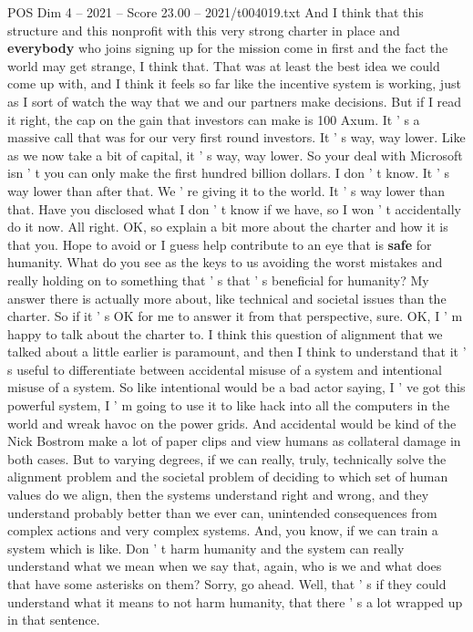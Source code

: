 \begin{textsample}{POS Dim 4 – 2021 – Score 23.00 – 2021/t004019.txt}
And I think that this structure and this nonprofit with this very strong charter in place and \textbf{everybody} who joins signing up for the mission come in first and the fact the world may get strange, I think that.
That was at least the best idea we could come up with, and I think it feels so far like the incentive system is working, just as I sort of watch the way that we and our partners make decisions.
But if I read it right, the cap on the gain that investors can make is 100 Axum.
It ' s a massive call that was for our very first round investors.
It ' s way, way lower.
Like as we now take a bit of capital, it ' s way, way lower.
So your deal with Microsoft isn ' t you can only make the first hundred billion dollars.
I don ' t know.
It ' s way lower than after that.
We ' re giving it to the world.
It ' s way lower than that.
Have you disclosed what I don ' t know if we have, so I won ' t accidentally do it now.
All right.
OK, so explain a bit more about the charter and how it is that you.
Hope to avoid or I guess help contribute to an eye that is \textbf{safe} for humanity.
What do you see as the keys to us avoiding the worst mistakes and really holding on to something that ' s that ' s beneficial for humanity?
My answer there is actually more about, like technical and societal issues than the charter.
So if it ' s OK for me to answer it from that perspective, sure.
OK, I ' m happy to talk about the charter to.
I think this question of alignment that we talked about a little earlier is paramount, and then I think to understand that it ' s useful to differentiate between accidental misuse of a system and intentional misuse of a system.
So like intentional would be a bad actor saying, I ' ve got this powerful system, I ' m going to use it to like hack into all the computers in the world and wreak havoc on the power grids.
And accidental would be kind of the Nick Bostrom make a lot of paper clips and view humans as collateral damage in both cases.
But to varying degrees, if we can really, truly, technically solve the alignment problem and the societal problem of deciding to which set of human values do we align, then the systems understand right and wrong, and they understand probably better than we ever can, unintended consequences from complex actions and very complex systems.
And, you know, if we can train a system which is like.
Don ' t harm humanity and the system can really understand what we mean when we say that, again, who is we and what does that have some asterisks on them?
Sorry, go ahead.
Well, that ' s if they could understand what it means to not harm humanity, that there ' s a lot wrapped up in that sentence.

\end{textsample}
